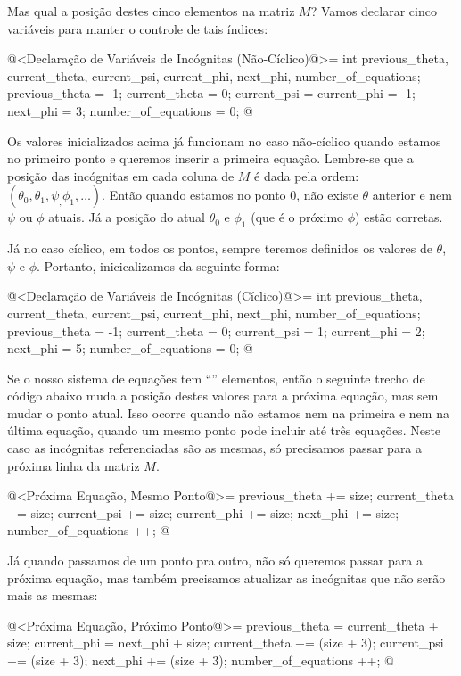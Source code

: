Mas qual a posição destes cinco elementos na matriz $M$? Vamos declarar
cinco variáveis para manter o controle de tais índices:

\iniciocodigo
@<Declaração de Variáveis de Incógnitas (Não-Cíclico)@>=
int previous_theta, current_theta, current_psi, current_phi, next_phi,
    number_of_equations;
previous_theta = -1;
current_theta = 0;
current_psi = current_phi = -1;
next_phi = 3;
number_of_equations = 0;
@
\fimcodigo

Os valores inicializados acima já funcionam no caso não-cíclico quando
estamos no primeiro ponto e queremos inserir a primeira
equação. Lembre-se que a posição das incógnitas em cada coluna de $M$
é dada pela ordem:
$(\theta_0, \theta_1, \psi_, \phi_1, \ldots)$. Então quando estamos no
ponto 0, não existe $\theta$ anterior e nem $\psi$ ou $\phi$
atuais. Já a posição do atual $\theta_0$ e $\phi_1$ (que é o próximo
$\phi$) estão corretas.

Já no caso cíclico, em todos os pontos, sempre teremos definidos os
valores de $\theta$, $\psi$ e $\phi$. Portanto, inicicalizamos da
seguinte forma:

\iniciocodigo
@<Declaração de Variáveis de Incógnitas (Cíclico)@>=
int previous_theta, current_theta, current_psi, current_phi, next_phi,
    number_of_equations;
previous_theta = -1;
current_theta = 0;
current_psi = 1;
current_phi = 2;
next_phi = 5;
number_of_equations = 0;
@
\fimcodigo


Se o nosso sistema de equações tem ``'' elementos,
então o seguinte trecho de código abaixo muda a posição destes valores
para a próxima equação, mas sem mudar o ponto atual. Isso ocorre
quando não estamos nem na primeira e nem na última equação, quando um
mesmo ponto pode incluir até três equações. Neste caso as incógnitas
referenciadas são as mesmas, só precisamos passar para a próxima linha
da matriz $M$.

\iniciocodigo
@<Próxima Equação, Mesmo Ponto@>=
{
  previous_theta += size;
  current_theta += size;
  current_psi += size;
  current_phi += size;
  next_phi += size;
  number_of_equations ++;
}
@
\fimcodigo

Já quando passamos de um ponto pra outro, não só queremos passar para
a próxima equação, mas também precisamos atualizar as incógnitas que
não serão mais as mesmas:

\iniciocodigo
@<Próxima Equação, Próximo Ponto@>=
{
  previous_theta = current_theta + size;
  current_phi = next_phi + size;
  current_theta += (size + 3);
  current_psi += (size + 3);
  next_phi += (size + 3);
  number_of_equations ++;
}
@
\fimcodigo

